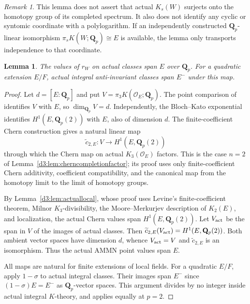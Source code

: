 \documentclass[11pt,a4paper]{amsart}
\numberwithin{equation}{section}
\newtheorem{lemma}[theorem]{Lemma}
\theoremstyle{definition}
\theoremstyle{remark}
\newtheorem{remark}[theorem]{Remark}
\newcommand{\Q}{\mathbf Q}
\begin{document}
\begin{remark}
This lemma does not assert that actual $K_s(W)$ surjects onto the
homotopy group of its completed spectrum. It also does not identify
any cyclic or syntomic coordinate with a polylogarithm. If an
independently constructed $\Q_p$-linear isomorphism
$\pi_sK(W;\Q_p)\cong E$ is available, the lemma only transports
independence to that coordinate.
\end{remark}

\begin{lemma}\label{d3:lem:directtcactualcoefficients}
The values of $r_W$ on actual classes span $E$ over $\mathbf Q_p$.
For a quadratic extension $E/F$, actual integral anti-invariant
classes span $E^{-}$ under this map.
\end{lemma}
\begin{proof}
Let $d=[E:\mathbf Q_p]$ and put
$V=\pi_3K(\mathcal O_E;\mathbf Q_p)$.
The point comparison of \cite[Proposition~4.10]{AMMN} identifies $V$ with $E$, so
$\dim_{\mathbf Q_p}V=d$. Independently, the Bloch--Kato exponential
identifies $H^1(E,\mathbf Q_p(2))$ with $E$, also of dimension $d$.
The finite-coefficient Chern construction gives a natural linear map
\[
 \widetilde c_{2,E}:V\longrightarrow H^1(E,\mathbf Q_p(2))
\]
through which the Chern map on actual $K_3(\mathcal O_E)$ factors.
This is the case $n=2$ of Lemma~\ref{d3:lem:cherncompletionfactor};
its proof uses only finite-coefficient Chern additivity,
coefficient compatibility, and the canonical map from the homotopy
limit to the limit of homotopy groups.

By Lemma~\ref{d3:lem:actuallocal}, whose proof uses Levine's
finite-coefficient theorem, Milnor $K_3$-divisibility, the
Moore--Merkurjev description of $K_2(E)$, and localization,
the actual Chern values span $H^1(E,\mathbf Q_p(2))$.
Let $V_{\rm act}$ be the span in $V$ of the images of actual classes.
Then $\widetilde c_{2,E}(V_{\rm act})=H^1(E,\mathbf Q_p(2))$.
Both ambient vector spaces have dimension $d$, whence
$V_{\rm act}=V$ and $\widetilde c_{2,E}$ is an isomorphism.
Thus the actual AMMN point values span $E$.

All maps are natural for finite extensions of local fields.
For a quadratic $E/F$, apply $1-\sigma$ to actual integral classes.
Their images span $E^-$ since $(1-\sigma)E=E^-$ as
$\mathbf Q_p$-vector spaces. This argument divides by no integer
inside actual integral $K$-theory, and applies equally at $p=2$.
\end{proof}
\end{document}
